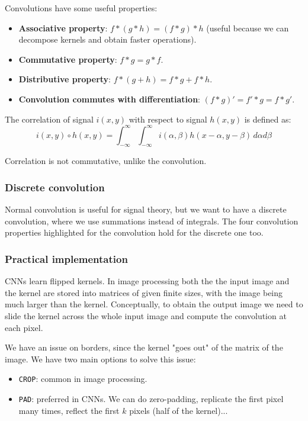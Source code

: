 \documentclass{article}
\begin{document}
Convolutions have some useful properties:
\begin{itemize}
  \item \textbf{Associative property}: $f * (g * h) = (f*g)*h$ (useful because we can decompose kernels and obtain faster operations).
  \item \textbf{Commutative property}: $f*g = g*f$.
  \item \textbf{Distributive property}: $f*(g+h) = f*g + f*h$.
  \item \textbf{Convolution commutes with differentiation}: $(f*g)' = f'*g = f*g'$.
\end{itemize}

The correlation of signal $i(x,y)$  with respect to signal $h(x,y)$ is defined as:
$$i(x,y) \circ h(x,y) = \int_{-\infty}^{\infty} \int_{-\infty}^{\infty} i(\alpha, \beta) h(x-\alpha, y-\beta) \, d\alpha  d\beta $$

Correlation is not commutative, unlike the convolution.

\subsubsection{Discrete convolution}

Normal convolution is useful for signal theory, but we want to have a discrete convolution, where we use summations instead of integrals.
The four convolution properties highlighted for the convolution hold for the discrete one too.

\subsubsection{Practical implementation}
CNNs learn flipped kernels.
In image processing both the the input image and the kernel are stored into matrices of given finite sizes, with the image being much larger than the kernel.
Conceptually, to obtain the output image we need to slide the kernel across the whole input image and compute the convolution at each pixel.

We have an issue on borders, since the kernel "goes out" of the matrix of the image.
We have two main options to solve this issue:
\begin{itemize}
  \item \verb|CROP|: common in image processing.
  \item \verb|PAD|: preferred in CNNs. We can do zero-padding, replicate the first pixel many times, reflect the first $k$ pixels (half of the kernel)...
\end{itemize}
\end{document}
